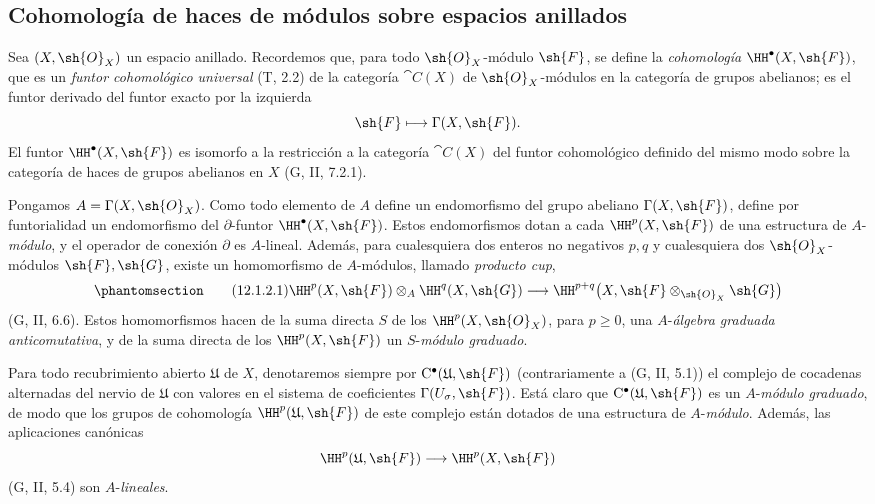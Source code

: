 \documentclass[oneside]{amsart}
\renewcommand{\geq}{\geqslant}
\newcommand{\oldpage}[2][]{{\marginnote{\normalfont\textbf{#1}~|~#2}}\ignorespaces}
\let\EGAOriginalLabel\label
\renewcommand{\label}[1]{\phantomsection\EGAOriginalLabel{#1}}
\begin{document}
\subsection{Cohomología de haces de módulos sobre espacios anillados}
\label{subsection:0.12.1}

\begin{env}[12.1.1]
\label{0.12.1.1}
\oldpage[0\textsubscript{III}]{49}
Sea $(X,\sh{O}_X)$ un espacio anillado.
Recordemos que, para todo $\sh{O}_X$-módulo $\sh{F}$, se define la
\emph{cohomología} $\HH^\bullet(X,\sh{F})$, que es un \emph{funtor cohomológico universal}
(T, 2.2) de la categoría $\cat{C}(X)$ de
$\sh{O}_X$-módulos en la categoría de grupos abelianos; es el funtor derivado
del funtor exacto por la izquierda
\[
  \sh{F}\longmapsto\Gamma(X,\sh{F}).
\]
El funtor $\HH^\bullet(X,\sh{F})$ es isomorfo
\oldpage[0\textsubscript{III}]{50}
a la restricción a la categoría $\cat{C}(X)$ del funtor cohomológico
definido del mismo modo sobre la categoría de haces de grupos abelianos
en $X$ (G, II, 7.2.1).
\end{env}

\begin{env}[12.1.2]
\label{0.12.1.2}
Pongamos $A=\Gamma(X,\sh{O}_X)$.
Como todo elemento de $A$ define un endomorfismo del grupo abeliano
$\Gamma(X,\sh{F})$, define por funtorialidad un endomorfismo del
$\partial$-funtor $\HH^\bullet(X,\sh{F})$.
Estos endomorfismos dotan a cada $\HH^p(X,\sh{F})$ de una
estructura de $A$-\emph{módulo}, y el operador de conexión $\partial$ es
$A$-lineal.
Además, para cualesquiera dos enteros no negativos $p,q$ y cualesquiera dos
$\sh{O}_X$-módulos $\sh{F},\sh{G}$, existe un homomorfismo de
$A$-módulos, llamado \emph{producto cup},
\[
\label{0.12.1.2.1}
\tag{12.1.2.1}
  \HH^p(X,\sh{F})\otimes_A\HH^q(X,\sh{G})
  \longrightarrow
  \HH^{p+q}\bigl(X,\sh{F}\otimes_{\sh{O}_X}\sh{G}\bigr)
\]
(G, II, 6.6).
Estos homomorfismos hacen de la suma directa $S$ de los
$\HH^p(X,\sh{O}_X)$, para $p\geq0$, una $A$-\emph{álgebra graduada
anticomutativa}, y de la suma directa de los $\HH^p(X,\sh{F})$ un
$S$-\emph{módulo graduado}.

Para todo recubrimiento abierto $\mathfrak{U}$ de $X$, denotaremos siempre
por $\mathrm{C}^\bullet(\mathfrak{U},\sh{F})$ (contrariamente a
(G, II, 5.1)) el complejo de cocadenas alternadas del nervio de
$\mathfrak{U}$ con valores en el sistema de coeficientes
$\Gamma(U_\sigma,\sh{F})$.
Está claro que
$\mathrm{C}^\bullet(\mathfrak{U},\sh{F})$ es un
$A$-\emph{módulo graduado}, de modo que los grupos de cohomología
$\HH^p(\mathfrak{U},\sh{F})$ de este complejo están dotados de
una estructura de $A$-\emph{módulo}.
Además, las aplicaciones canónicas
\[
  \HH^p(\mathfrak{U},\sh{F})
  \longrightarrow
  \HH^p(X,\sh{F})
\]
(G, II, 5.4) son $A$-\emph{lineales}.
\end{env}
\end{document}
